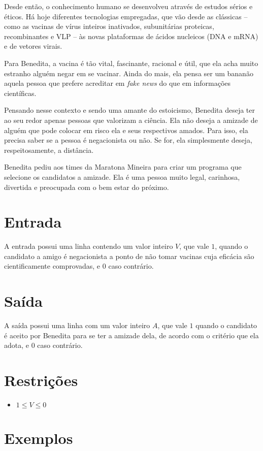 Desde então, o conhecimento humano se desenvolveu através de estudos sérios e éticos. Há hoje diferentes tecnologias empregadas, que vão desde as clássicas -- como as vacinas de vírus inteiros inativados, subunitárias proteicas, recombinantes e VLP -- às novas plataformas de ácidos nucleicos (DNA e mRNA) e de vetores virais.

Para Benedita, a vacina é tão vital, fascinante, racional e útil, que ela acha muito estranho alguém negar em se vacinar. Ainda do mais, ela pensa ser um bananão aquela pessoa que prefere acreditar em \textit{fake news} do que em informações científicas.

Pensando nesse contexto e sendo uma amante do estoicismo, Benedita deseja ter ao seu redor apenas pessoas que valorizam a ciência. Ela não deseja a amizade de alguém que pode colocar em risco ela e seus respectivos amados. Para isso, ela precisa saber se a pessoa é negacionista ou não. Se for, ela simplesmente deseja, respeitosamente, a distância.

Benedita pediu aos times da Maratona Mineira para criar um programa que selecione os candidatos a amizade. Ela é uma pessoa muito legal, carinhosa, divertida e preocupada com o bem estar do próximo.

\section*{Entrada}

A entrada possui uma linha contendo um valor inteiro $V$, que vale $1$, quando o candidato a amigo é negacionista a ponto de não tomar vacinas cuja eficácia são cientificamente comprovadas, e $0$ caso contrário.

\section*{Saída}

A saída possui uma linha com um valor inteiro $A$, que vale $1$ quando o candidato é aceito por Benedita para se ter a amizade dela, de acordo com o critério que ela adota, e $0$ caso contrário.

\section*{Restrições}

\begin{itemize}
	\item $1 \leq V \leq 0$
\end{itemize}


\section*{Exemplos}

\exemplo
